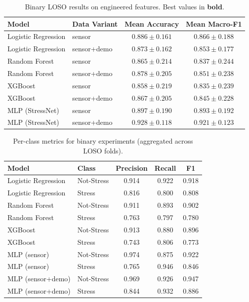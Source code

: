 \documentclass[11pt]{article}
\begin{document}
\begin{table}[H]
\centering
\caption{Binary LOSO results on engineered features. Best values in \textbf{bold}.}
\label{tab:binary}
\begin{tabular}{llcc}
\toprule
\textbf{Model} & \textbf{Data Variant} & \textbf{Mean Accuracy} & \textbf{Mean Macro-F1} \\
\midrule
Logistic Regression & sensor        & $0.886 \pm 0.161$ & $0.866 \pm 0.188$ \\
Logistic Regression & sensor+demo   & $0.873 \pm 0.162$ & $0.853 \pm 0.177$ \\
\midrule
Random Forest       & sensor        & $0.865 \pm 0.214$ & $0.837 \pm 0.244$ \\
Random Forest       & sensor+demo   & $0.878 \pm 0.205$ & $0.851 \pm 0.238$ \\
\midrule
XGBoost             & sensor        & $0.858 \pm 0.219$ & $0.835 \pm 0.239$ \\
XGBoost             & sensor+demo   & $0.867 \pm 0.205$ & $0.845 \pm 0.228$ \\
\midrule
MLP (StressNet)     & sensor        & $0.897 \pm 0.190$ & $0.893 \pm 0.192$ \\
MLP (StressNet)     & sensor+demo   & $\mathbf{0.928 \pm 0.118}$ & $\mathbf{0.921 \pm 0.123}$ \\
\bottomrule
\end{tabular}
\end{table}

\begin{table}[H]
\centering
\caption{Per-class metrics for binary experiments (aggregated across LOSO folds).}
\label{tab:binary-perclass}
\begin{tabular}{llccc}
\toprule
\textbf{Model} & \textbf{Class} & \textbf{Precision} & \textbf{Recall} & \textbf{F1} \\
\midrule
Logistic Regression & Not-Stress & 0.914 & 0.922 & 0.918 \\
Logistic Regression & Stress     & 0.816 & 0.800 & 0.808 \\
\midrule
Random Forest       & Not-Stress & 0.911 & 0.893 & 0.902 \\
Random Forest       & Stress     & 0.763 & 0.797 & 0.780 \\
\midrule
XGBoost             & Not-Stress & 0.913 & 0.880 & 0.896 \\
XGBoost             & Stress     & 0.743 & 0.806 & 0.773 \\
\midrule
MLP (sensor)        & Not-Stress & 0.974 & 0.875 & 0.922 \\
MLP (sensor)        & Stress     & 0.765 & 0.946 & 0.846 \\
\midrule
MLP (sensor+demo)   & Not-Stress & 0.969 & 0.926 & 0.947 \\
MLP (sensor+demo)   & Stress     & 0.844 & 0.932 & 0.886 \\
\bottomrule
\end{tabular}
\end{table}
\end{document}
